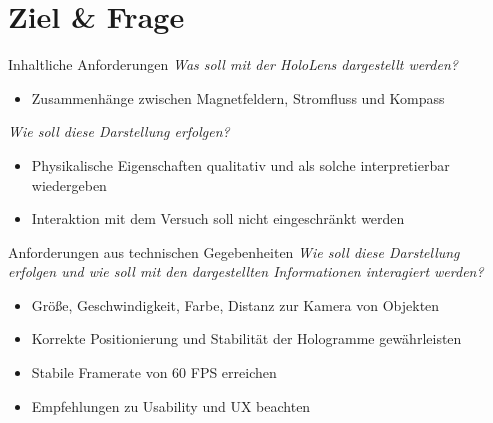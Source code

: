 \part{Ziel \& Frage}
\label{part:goal}

\begin{frame}[fragile]{Inhaltliche Anforderungen}
\textit{Was soll mit der HoloLens dargestellt werden?}
\begin{itemize}
	\item Zusammenhänge zwischen Magnetfeldern, Stromfluss und Kompass
\end{itemize}
\textit{Wie soll diese Darstellung erfolgen?}
\begin{itemize}
	\item Physikalische Eigenschaften qualitativ und als solche interpretierbar wiedergeben
	\item Interaktion mit dem Versuch soll nicht eingeschränkt werden
\end{itemize}
\end{frame}


\begin{frame}[fragile]{Anforderungen aus technischen Gegebenheiten}
\textit{Wie soll diese Darstellung erfolgen und wie soll mit den dargestellten Informationen interagiert werden?}
\begin{itemize}
\item Größe, Geschwindigkeit, Farbe, Distanz zur Kamera von Objekten
\pause
\item Korrekte Positionierung und Stabilität der Hologramme gewährleisten
\pause
\item Stabile Framerate von 60 FPS erreichen
\pause
\item Empfehlungen zu Usability und UX beachten
\end{itemize}
\end{frame}
